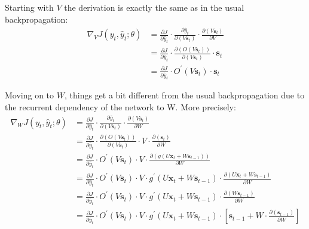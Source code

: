 Starting with $V$ the derivation is exactly the same as in the usual backpropagation:
{\setlength{\jot}{5pt}
\begin{align*}
\nabla_V J(y_t, \hat{y}_t ; \theta)& = \frac{\partial J}{\partial \hat{y}_t}
\cdot \frac{\partial \hat{y}_t}{\partial (V \boldsymbol{s}_{t})} \cdot \frac{\partial (V \boldsymbol{s}_{t})}{\partial
V} \\
& = \frac{\partial J}{\partial \hat{y}_t}
\cdot \frac{ \partial ( O(V \boldsymbol{s}_{t}))}{\partial (V\boldsymbol{s}_{t})} \cdot \boldsymbol{s}_{t}\\
& = \frac{\partial J}{\partial \hat{y}_t} \cdot O^\prime(V \boldsymbol{s}_{t}) \cdot \boldsymbol{s}_{t}
\end{align*}}

Moving on to $W$, things get a bit different from the usual backpropagation due to the recurrent dependency of the
network to W. More precisely: \v
\begingroup
\allowdisplaybreaks
{\setlength{\jot}{5pt}
\begin{align*}
\nabla_W J(y_t, \hat{y}_t ; \theta)& = \frac{\partial J}{\partial \hat{y}_t}
\cdot \frac{\partial \hat{y}_t}{\partial (V \boldsymbol{s}_{t})} \cdot \frac{\partial (V\boldsymbol{s}_{t})}{\partial W}
\\
&= \frac{\partial J}{\partial \hat{y}_t} \cdot \frac{ \partial ( O(V\boldsymbol{s}_{t}))}{\partial
(V\boldsymbol{s}_{t})}
\cdot V \cdot \frac{\partial (\boldsymbol{s}_{t})} {\partial W} \\
&= \frac{\partial J}{\partial \hat{y}_t} \cdot O^\prime(V\boldsymbol{s}_{t})
\cdot V \cdot \frac{\partial (g(U \boldsymbol{x}_{t} + W \boldsymbol{s}_{t-1}))} {\partial W} \\
&= \frac{\partial J}{\partial \hat{y}_t} \cdot O^\prime(V \boldsymbol{s}_{t})
\cdot V \cdot g^\prime(U \boldsymbol{x}_{t} + W \boldsymbol{s}_{t-1})
\cdot \frac{\partial (U\boldsymbol{x}_{t} + W \boldsymbol{s}_{t-1})} {\partial W} \\
& = \frac{\partial J}{\partial \hat{y}_t} \cdot O^\prime(V\boldsymbol{s}_{t})
\cdot V \cdot g^\prime(U \boldsymbol{x}_{t} + W \boldsymbol{s}_{t-1})
\cdot \frac{\partial (W\boldsymbol{s}_{t-1})} {\partial W} \\
& = \frac{\partial J}{\partial \hat{y}_t} \cdot O^\prime(V \boldsymbol{s}_{t})
\cdot V \cdot g^\prime(U \boldsymbol{x}_{t} + W \boldsymbol{s}_{t-1})
\cdot \left[ \boldsymbol{s}_{t-1} + W \cdot \frac{\partial(\boldsymbol{s}_{t-1})} {\partial W} \right]
\end{align*}}
\endgroup

